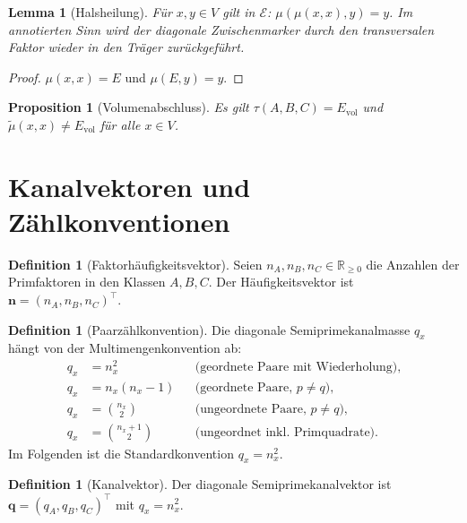 \documentclass[11pt,a4paper]{article}
\newtheorem{lemma}[theorem]{Lemma}
\newtheorem{proposition}[theorem]{Proposition}
\theoremstyle{definition}
\newtheorem{definition}[theorem]{Definition}
\theoremstyle{remark}
\newcommand{\E}{\mathcal{E}}
\newcommand{\R}{\mathbb{R}}
\newcommand{\qq}{\mathbf{q}}
\newcommand{\nn}{\mathbf{n}}
\newcommand{\Evol}{E_{\mathrm{vol}}}
\begin{document}
	\begin{lemma}[Halsheilung]
		\label{lem:neck}
		Für $x,y\in V$ gilt in $\E$:
		$\mu(\mu(x,x),y)=y$.
		Im annotierten Sinn wird der diagonale Zwischenmarker durch den transversalen
		Faktor wieder in den Träger zurückgeführt.
	\end{lemma}
	
	\begin{proof}
		$\mu(x,x)=E$ und $\mu(E,y)=y$.
	\end{proof}
	
	\begin{proposition}[Volumenabschluss]
		\label{prop:volume}
		Es gilt $\tau(A,B,C)=\Evol$ und
		$\widetilde\mu(x,x)\neq\Evol$ für alle $x\in V$.
	\end{proposition}
	
	\section{Kanalvektoren und Zählkonventionen}
	\label{sec:channels}
	
	\begin{definition}[Faktorhäufigkeitsvektor]
		\label{def:n}
		Seien $n_A,n_B,n_C\in\R_{\ge 0}$ die Anzahlen der Primfaktoren in den Klassen
		$A,B,C$. Der Häufigkeitsvektor ist
		$\nn=(n_A,n_B,n_C)^\top$.
	\end{definition}
	
	\begin{definition}[Paarzählkonvention]
		\label{def:convention}
		Die diagonale Semiprimekanalmasse $q_x$ hängt von der Multimengenkonvention ab:
		\begin{align*}
			q_x&=n_x^2
			&&\text{(geordnete Paare mit Wiederholung)},\\
			q_x&=n_x(n_x-1)
			&&\text{(geordnete Paare, $p\neq q$)},\\
			q_x&=\binom{n_x}{2}
			&&\text{(ungeordnete Paare, $p\neq q$)},\\
			q_x&=\binom{n_x+1}{2}
			&&\text{(ungeordnet inkl.\ Primquadrate)}.
		\end{align*}
		Im Folgenden ist die Standardkonvention $q_x=n_x^2$.
	\end{definition}
	
	\begin{definition}[Kanalvektor]
		\label{def:q}
		Der diagonale Semiprimekanalvektor ist
		$\qq=(q_A,q_B,q_C)^\top$ mit $q_x=n_x^2$.
	\end{definition}
	
\end{document}
